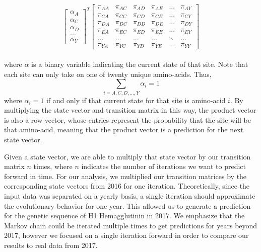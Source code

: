 \documentclass[12pt]{article}
\begin{document}
\begin{multicols}{2}
\[
    \begin{bmatrix}
        \alpha_A \\ \alpha_C \\ \alpha_D \\ ... \\ \alpha_Y
    \end{bmatrix}^T
    \begin{bmatrix}
        \pi_{AA} & \pi_{AC} & \pi_{AD} & \pi_{AE} &... & \pi_{AY}\\
        \pi_{CA} & \pi_{CC} & \pi_{CD} & \pi_{CE} &... & \pi_{CY}\\
        \pi_{DA} & \pi_{DC} & \pi_{DD} & \pi_{DE} &... & \pi_{DY}\\
        \pi_{EA} & \pi_{EC} & \pi_{ED} & \pi_{EE} &... & \pi_{EY}\\
        ... & ... & ... & ... &\ddots & ... \\
        \pi_{YA} & \pi_{YC} & \pi_{YD} & \pi_{YE} &... & \pi_{YY}
    \end{bmatrix}
\]\\
where $\alpha$ is a binary variable indicating the current state of that site. Note that each site can only take on one of twenty unique amino-acids. Thus,
$$
\sum_{i = A, C, D, ..., Y} \alpha_i = 1
$$
where $\alpha_i = 1$ if and only if that current state for that site is amino-acid $i$. By multiplying the state vector and transition matrix in this way, the product vector is also a row vector, whose entries represent the probability that the site will be that amino-acid, meaning that the product vector is a prediction for the next state vector.

Given a state vector, we are able to multiply that state vector by our transition matrix $n$ times, where $n$ indicates the number of iterations we want to predict forward in time. For our analysis, we multiplied our transition matrices by the corresponding state vectors from 2016 for one iteration. Theoretically, since the input data was separated on a yearly basis, a single iteration should approximate the evolutionary behavior for one year. This allowed us to generate a prediction for the genetic sequence of H1 Hemagglutinin in 2017. We emphasize that the Markov chain could be iterated multiple times to get predictions for years beyond 2017, however we focused on a single iteration forward in order to compare our results to real data from 2017.


\end{multicols}
\end{document}

